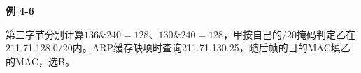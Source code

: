 {\color{ink}\bfseries 例 4-6}\par\vspace{1bp}第三字节分别计算\(136 \mathbin{\&} 240=\allowbreak{}128\)、\(130 \mathbin{\&} 240=\allowbreak{}128\)，甲按自己的/\allowbreak{}20掩码判定乙在211.71.128.0/\allowbreak{}20内。ARP缓存缺项时查询211.71.130.25，随后帧的目的MAC填乙的MAC，选B。
